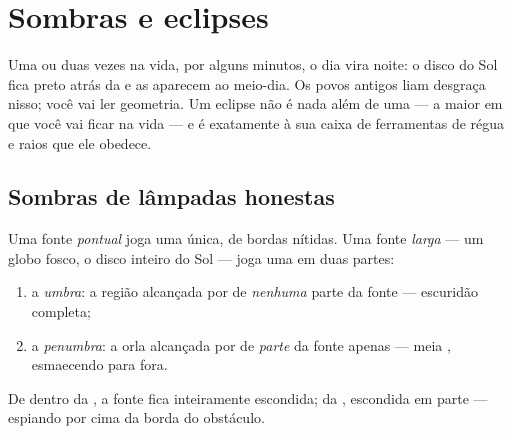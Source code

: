 \chapter{Sombras e eclipses}\label{ch:g7:shadows-eclipses}

Uma ou duas vezes na vida, por alguns minutos, o dia vira noite: o
disco do Sol fica preto atrás da  e as  aparecem ao
meio-dia. Os povos antigos liam desgraça nisso; você vai ler
geometria. Um eclipse não é nada além de uma  --- a maior
 em que você vai ficar na vida --- e é exatamente à sua caixa
de ferramentas de régua e raios que ele obedece.

\section{Sombras de lâmpadas honestas}

\begin{proposition}\label{prop:g7:shadows-eclipses:umbra}
Uma fonte \emph{pontual} joga uma  única, de bordas nítidas.
Uma fonte \emph{larga} --- um globo fosco, o disco inteiro do Sol ---
joga uma  em duas partes:
\begin{enumerate}
  \item a \emph{umbra}: a região alcançada por  de
        \emph{nenhuma} parte da fonte --- escuridão completa;
  \item a \emph{penumbra}: a orla alcançada por 
        de \emph{parte} da fonte apenas --- meia , esmaecendo
        para fora.
\end{enumerate}
De dentro da , a fonte fica inteiramente escondida; da
, escondida em parte --- espiando por cima da borda do
obstáculo.
\end{proposition}

